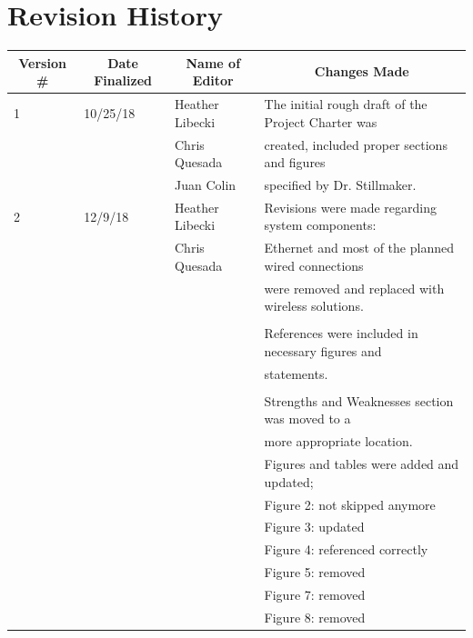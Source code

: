 \section*{Revision History}
\begin{table} [H]	
	\normalsize
	\centering
	\begin{tabular}{|l|l|l|l|}
		\hline
		\multicolumn{1}{|c|}{\textbf{Version \#}} & 
		\multicolumn{1}{|c|}{\textbf{Date Finalized}} &
		\multicolumn{1}{|c|}{\textbf{Name of Editor}} & 
		\multicolumn{1}{|c|}{\textbf{Changes Made}} \\
		\hline
	  1 & 10/25/18 	 & Heather Libecki                 & The initial rough draft of the Project Charter was \\ 
	     &			 & Chris Quesada   		   & created, included proper sections and figures \\ 
	     &			 & Juan Colin     		   & specified by Dr. Stillmaker.\\
		\hline
	   2 & 12/9/18 	 & Heather Libecki  		   & Revisions were made regarding system components:\\ 
	      &			 & Chris Quesada  		   & Ethernet and most of the planned wired connections\\
	      &			 &				   & were removed and replaced with wireless solutions. \\ 
	      &			 &				   & 	\\
	      &			 &				   & References were included in necessary figures and \\
	      &			 &				   & statements. \\
	      &			 &				   & 	\\
	      &			 &				   & Strengths and Weaknesses section was moved to a \\
	      &			 &				   & more appropriate location.\\
	      &			 &				   & Figures and tables were added and updated;\\
	      &			 &				   & Figure 2: not skipped anymore\\
	      &         		 &                			   & Figure 3: updated\\
	      &			 &				   & Figure 4: referenced correctly\\
	      &          		 &                			   & Figure 5: removed\\
	      &			 &				   & Figure 7: removed\\
	      &			 &				   & Figure 8: removed\\

\end{tabular}
\end{table}
